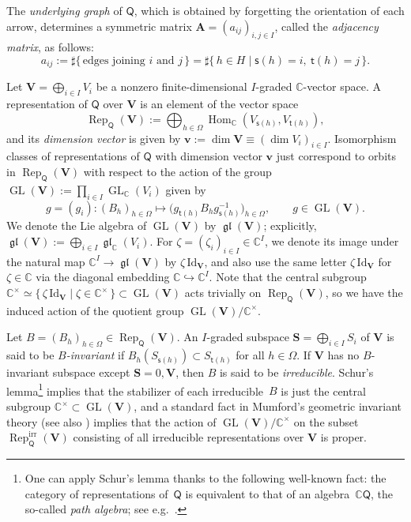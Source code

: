 \documentclass[pdftex]{sigma}
\numberwithin{equation}{section}
\theoremstyle{definition}
\newcommand{\C}{\mathbb{C}} %
\newcommand{\GL}{\operatorname{GL}} %
\newcommand{\gl}{\operatorname{\mathfrak{gl}}}
\newcommand{\Hom}{\operatorname{Hom}}
\newcommand{\unit}{\mathrm{Id}}
\newcommand{\Rep}{\operatorname{Rep}}
\newcommand{\bA}{\mathbf{A}} %
\newcommand{\bV}{\mathbf{V}}
\newcommand{\bv}{\mathbf{v}}
\newcommand{\bS}{\mathbf{S}}
\newcommand{\irr}{\mathrm{irr}}
\newcommand{\vin}{\mathsf{t}} %
\newcommand{\vout}{\mathsf{s}} %
\newcommand{\QQ}{\mathsf{Q}} %
\begin{document}
The {\em underlying graph} of $\QQ$,
which is obtained by forgetting the orientation of each arrow,
determines a symmetric matrix $\bA=(a_{ij})_{i,j \in I}$,
called the {\em adjacency matrix}, as follows:
\[
a_{ij} := \sharp\{\,\text{edges joining $i$ and $j$}\,\}
= \sharp\{\, h \in H \mid \vout(h)=i,\ \vin(h)=j \,\}.
\]

Let $\bV=\bigoplus_{i \in I} V_i$ be a nonzero f\/inite-dimensional
$I$-graded $\C$-vector space.
A representation of $\QQ$ over $\bV$ is an element of the vector space
\[
\Rep_\QQ(\bV):= \bigoplus_{h \in \Omega}
\Hom_\C(V_{\vout(h)},V_{\vin(h)}),
\]
and its {\em dimension vector} is given by
$\bv := \dim \bV \equiv (\dim V_i)_{i \in I}$.
Isomorphism classes of representations of $\QQ$ with dimension vector $\bv$
just correspond to orbits in $\Rep_\QQ(\bV)$
with respect to the action of the group
$\GL(\bV):=\prod\limits_{i \in I} \GL_\C(V_i)$ given by
\[
g=(g_i) \colon (B_h)_{h \in \Omega} \longmapsto
\bigl( g_{\vin(h)}B_h g_{\vout(h)}^{-1} \bigr)_{h \in \Omega},
\qquad g \in \GL(\bV).
\]
We denote the Lie algebra of $\GL(\bV)$ by $\gl(\bV)$; explicitly,
$\gl(\bV):=\bigoplus_{i \in I} \gl_\C(V_i)$.
For $\zeta =(\zeta_i)_{i \in I} \in \C^I$,
we denote its image under the natural map $\C^I \to \gl(\bV)$
by $\zeta\,\unit_\bV$,
and also use the same letter $\zeta\,\unit_\bV$
for $\zeta \in \C$ via the diagonal embedding $\C \hookrightarrow \C^I$.
Note that the central subgroup
$\C^\times \simeq
\{\,\zeta\,\unit_\bV \mid \zeta \in \C^\times\,\} \subset \GL(\bV)$
acts trivially on $\Rep_\QQ(\bV)$,
so we have the induced action of the quotient group
$\GL(\bV)/\C^\times$.

Let $B=(B_h)_{h \in \Omega} \in \Rep_\QQ(\bV)$.
An $I$-graded subspace $\bS=\bigoplus_{i \in I}S_i$ of $\bV$ is said to be
{\em $B$-invariant} if
$B_h(S_{\vout(h)}) \subset S_{\vin(h)}$ for all $h \in \Omega$.
If $\bV$ has no $B$-invariant subspace except $\bS=0, \bV$,
then $B$ is said to be {\em irreducible}.
Schur's lemma\footnote{One can apply Schur's lemma
thanks to the following well-known fact:
the category of representations of~$\QQ$
is equivalent to that of an algebra~$\C \QQ$,
the so-called {\em path algebra}; see e.g.~\cite{Etingof}.}
implies that the stabilizer of each irreducible~$B$
is just the central subgroup $\C^\times \subset \GL(\bV)$,
and a standard fact in
Mumford's geometric invariant theory
\cite[Corollary~2.5]{MR1304906} (see also \cite{MR1315461})
implies that the action of $\GL(\bV)/\C^\times$ on the subset
$\Rep_\QQ^\irr(\bV)$ consisting of all irreducible representations
over $\bV$ is proper.
\end{document}
